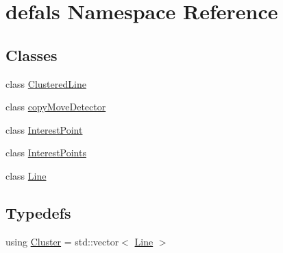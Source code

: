 \hypertarget{namespacedefals}{}\section{defals Namespace Reference}
\label{namespacedefals}
\subsection*{Classes}
\begin{DoxyCompactItemize}
\item 
class \hyperlink{classdefals_1_1_clustered_line}{Clustered\+Line}
\item 
class \hyperlink{classdefals_1_1copy_move_detector}{copy\+Move\+Detector}
\item 
class \hyperlink{classdefals_1_1_interest_point}{Interest\+Point}
\item 
class \hyperlink{classdefals_1_1_interest_points}{Interest\+Points}
\item 
class \hyperlink{classdefals_1_1_line}{Line}
\end{DoxyCompactItemize}
\subsection*{Typedefs}
\begin{DoxyCompactItemize}
\item 
using \hyperlink{namespacedefals_a93b34e2e4f989ac1ebef9f660cf3a303}{Cluster} = std\+::vector$<$ \hyperlink{classdefals_1_1_line}{Line} $>$
\end{DoxyCompactItemize}
